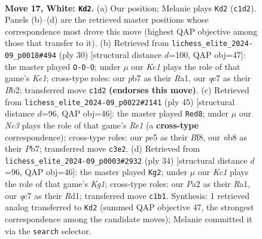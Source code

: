 \documentclass[11pt]{article}
\begin{document}
\clearpage

\begin{figure}[p]\centering
\begin{subfigure}{0.46\textwidth}\centering
\resizebox{\linewidth}{!}{%
\newchessgame
\chessboard[
  setfen={rn5r/ppqbk1bp/3pp1p1/1B2p1Pn/4P3/2N1B3/PPP2PQP/2KRR3 w - - 2 17},
  showmover=false,
  pgfstyle=straightmove, color=movearrow, markmove={c1-d2}
]}
\caption{}
\end{subfigure}\hfill
\begin{subfigure}{0.46\textwidth}\centering
\resizebox{\linewidth}{!}{%
\newchessgame
\chessboard[
  setfen={r1bqrbk1/1pp2pp1/p4n1p/3p4/8/PP1BPN2/1BQP1P1P/R3K1R1 w Q - 0 16},
  showmover=false,
  pgfstyle=straightmove, color=movearrow, markmove={e1-c1}
]}
\caption{}
\end{subfigure}
\\[4pt]
\begin{subfigure}{0.46\textwidth}\centering
\resizebox{\linewidth}{!}{%
\newchessgame
\chessboard[
  setfen={r3rbk1/1pq2pp1/2p1b1np/1P2p3/Pn2P3/4N1PP/3N1PBK/RQB1R3 b - - 2 23},
  showmover=false,
  pgfstyle=straightmove, color=movearrow, markmove={e8-d8}
]}
\caption{}
\end{subfigure}\hfill
\begin{subfigure}{0.46\textwidth}\centering
\resizebox{\linewidth}{!}{%
\newchessgame
\chessboard[
  setfen={r1br2k1/1pq1bpp1/p1p1pn1p/4N3/2PP4/4BBP1/PPQ2P1P/R2R2K1 w - - 5 18},
  showmover=false,
  pgfstyle=straightmove, color=movearrow, markmove={g1-g2}
]}
\caption{}
\end{subfigure}
\caption{\textbf{Move 17, White: \texttt{Kd2}.} (a) Our position; Melanie plays \texttt{Kd2} (\texttt{c1d2}). Panels (b)--(d) are the retrieved master positions whose correspondence most drove this move (highest QAP objective among those that transfer to it). (b) Retrieved from \texttt{lichess\_elite\_2024-09\_p0018\#494} (ply 30) [structural distance $d$=100, QAP obj=47]: the master played \texttt{O-O-O}; under $\mu$ our \emph{Kc1} plays the role of that game's \emph{Ke1}; cross-type roles: our \emph{p}b7 as their \emph{R}a1, our \emph{q}c7 as their \emph{B}b2; transferred move \texttt{c1d2} \textbf{(endorses this move)}. (c) Retrieved from \texttt{lichess\_elite\_2024-09\_p0022\#2141} (ply 45) [structural distance $d$=96, QAP obj=46]: the master played \texttt{Red8}; under $\mu$ our \emph{Nc3} plays the role of that game's \emph{Re1} (a \textbf{cross-type} correspondence); cross-type roles: our \emph{p}e5 as their \emph{B}f8, our \emph{n}b8 as their \emph{P}b7; transferred move \texttt{c3e2}. (d) Retrieved from \texttt{lichess\_elite\_2024-09\_p0003\#2932} (ply 34) [structural distance $d$=96, QAP obj=46]: the master played \texttt{Kg2}; under $\mu$ our \emph{Kc1} plays the role of that game's \emph{Kg1}; cross-type roles: our \emph{P}a2 as their \emph{R}a1, our \emph{q}c7 as their \emph{R}d1; transferred move \texttt{c1b1}. Synthesis: 1 retrieved analog transferred to \texttt{Kd2} (summed QAP objective 47, the strongest correspondence among the candidate moves); Melanie committed it via the \texttt{search} selector.}
\label{fig:thought-m32}
\end{figure}
\end{document}
